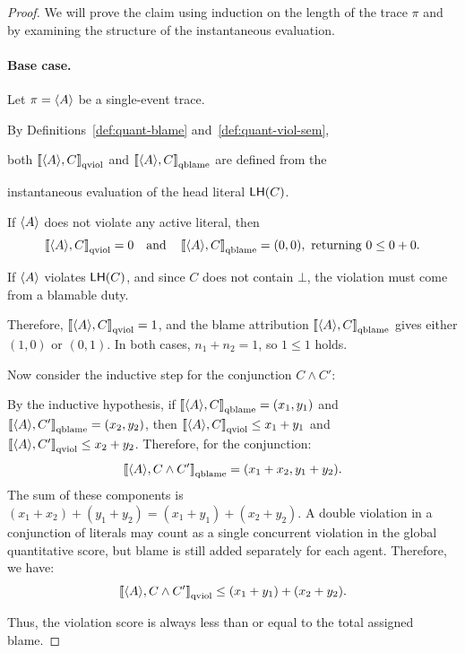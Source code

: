         \begin{proof}
            We will prove the claim using induction on the length of the trace $\pi$ and by examining the structure of the instantaneous evaluation.

            

            \paragraph{Base case.}

            Let $\pi=\langle A \rangle $ be a single-event trace.

            By Definitions~\ref{def:quant-blame} and~\ref{def:quant-viol-sem},

            both $\left\llbracket \langle A \rangle ,C \right\rrbracket_{\text{qviol}}$ and $\left\llbracket \langle A \rangle ,C \right\rrbracket_{\text{qblame}}$ are defined from the

            instantaneous evaluation of the head literal $\mathsf{LH}(C)$.

            

If $\langle A \rangle $ does not violate any active literal, then
            \[
            \left\llbracket \langle A \rangle ,C \right\rrbracket_{\text{qviol}}=0
            \quad\text{and}\quad
            \left\llbracket \langle A \rangle ,C \right\rrbracket_{\text{qblame}}=(0,0), \text{ returning } 0 \le 0+0.
            \]

If $\langle A \rangle $ violates $\mathsf{LH}(C)$, and since $C$ does not contain $\bot$, the violation must come from a blamable duty.

Therefore, $\left\llbracket \langle A \rangle ,C \right\rrbracket_{\text{qviol}}=1$, and the blame attribution $\left\llbracket \langle A \rangle ,C \right\rrbracket_{\text{qblame}}$ gives either $(1,0)$ or $(0,1)$. In both cases, $n_1+n_2 = 1$, so $1 \le 1$ holds.



Now consider the inductive step for the conjunction $C \wedge C'$:

By the inductive hypothesis, if $\left\llbracket \langle A \rangle ,C \right\rrbracket_{\text{qblame}} = (x_1, y_1)$ and $\left\llbracket \langle A \rangle ,C' \right\rrbracket_{\text{qblame}} = (x_2, y_2)$, then $\left\llbracket \langle A \rangle ,C \right\rrbracket_{\text{qviol}} \le x_1 + y_1$ and $\left\llbracket \langle A \rangle ,C' \right\rrbracket_{\text{qviol}} \le x_2 + y_2$.
Therefore, for the conjunction:
            \[
            \left\llbracket \langle A \rangle ,C \wedge C' \right\rrbracket_{\text{qblame}} = (x_1+x_2, y_1+y_2).
            \]
The sum of these components is $(x_1+x_2) + (y_1+y_2) = (x_1+y_1) + (x_2+y_2)$.
A double violation in a conjunction of literals may count as a single concurrent violation in the global quantitative score, but blame is still added separately for each agent. Therefore, we have:
            \[
            \left\llbracket \langle A \rangle ,C \wedge C' \right\rrbracket_{\text{qviol}} \le (x_1+y_1) + (x_2+y_2).
            \]

Thus, the violation score is always less than or equal to the total assigned blame.

\end{proof}
